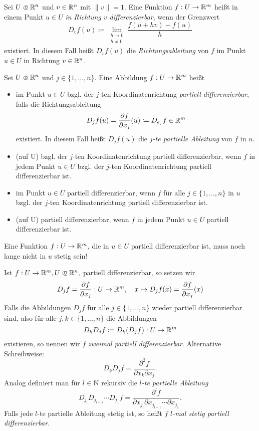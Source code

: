 \documentclass{cheat-sheet}
\begin{document}
\begin{defn}
Sei $U \opn \R^n$ und $v \in \mathbb{R}^n$ mit $\| v \| = 1$. Eine Funktion $f : U \to \mathbb{R}^m$ heißt in einem Punkt $u \in U$ \emph{in Richtung $v$ differenzierbar}, wenn der Grenzwert
\[ D_v f(u) \coloneqq \lim_{\substack{h \to 0\\h \not= 0}} \frac{f(u + hv) - f(u)}{h} \]
existiert. In diesem Fall heißt $D_v f(u)$ die \emph{Richtungsableitung} von $f$ im Punkt $u \in U$ in Richtung $v \in \mathbb{R}^n$.
\end{defn}

\begin{defn}
Sei $U \opn \R^n$ und $j \in \{ 1, ..., n \}$. Eine Abbildung $f : U \to \mathbb{R}^m$ heißt
\begin{itemize}
  \item im Punkt $u \in U$ bzgl. der $j$-ten Koordinatenrichtung \emph{partiell differenzierbar}, falls die Richtungsableitung
  \[ D_j f(u) = \frac{\partial f}{\partial x_j}(u) \coloneqq D_{e_j} f \in \mathbb{R}^m \]
  existiert. In diesem Fall heißt $D_j f(u)$ die \emph{$j$-te partielle Ableitung} von $f$ in $u$.
  \item (auf U) bzgl. der $j$-ten Koordinatenrichtung partiell differenzierbar, wenn $f$ in jedem Punkt $u \in U$ bzgl. der $j$-ten Koordinatenrichtung partiell differenzierbar ist.
  \item im Punkt $u \in U$ partiell differenzierbar, wenn $f$ für alle $j \in \{ 1, ..., n \}$ in $u$ bzgl. der $j$-ten Koordinatenrichtung partiell differenzierbar ist.
  \item (auf U) partiell differenzierbar, wenn $f$ in jedem Punkt $u \in U$ partiell differenzierbar ist.
\end{itemize}
\end{defn}

\begin{acht}
Eine Funktion $f : U \to \mathbb{R}^m$, die in $u \in U$ partiell differenzierbar ist, muss noch lange nicht in $u$ stetig sein!
\end{acht}

\begin{defn}
Ist $f : U \to \R^m, U \opn \R^n,$ partiell differenzierbar, so setzen wir
\[ D_j f = \frac{\partial f}{\partial x_j} : U \to \mathbb{R}^m,\quad x \mapsto D_j f(x) = \frac{\partial f}{\partial x_j}(x) \]
Falls die Abbildungen $D_j f$ für alle $j \in \{ 1, ..., n \}$ wieder partiell differenzierbar sind, also für alle $j, k \in \{ 1, ..., n \}$ die Abbildungen
\[ D_k D_j f \coloneqq D_k (D_j f) : U \to \mathbb{R}^m \]
existieren, so nennen wir $f$ \emph{zweimal partiell differenzierbar}. Alternative Schreibweise:
\[ D_k D_j f = \frac{\partial^2 f}{\partial x_k \partial x_j}. \]
Analog definiert man für $l \in \mathbb{N}$ rekursiv die \emph{$l$-te partielle Ableitung}
\[ D_{j_l} D_{j_{l-1}} \cdots D_{j_1} f = \frac{\partial^l f}{\partial x_{j_l} \partial x_{j_{l-1}} \cdots \partial x_{j_1}}. \]
Falls jede $l$-te partielle Ableitung stetig ist, so heißt $f$ \emph{$l$-mal stetig partiell differenzierbar}.
\end{defn}
\end{document}
